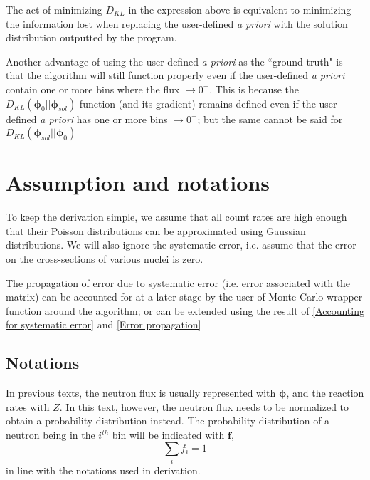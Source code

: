 \documentclass[a4paper, 12pt]{article}
\newcommand{\matr}[1]{\uuline{\bf{#1}}}
\newcommand{\ve}[1]{\boldsymbol{#1}}
\newcommand{\apriori}[0]{\textit{a priori} }
\begin{document}
    The act of minimizing $D_{KL}$ in the expression above is equivalent to minimizing the information lost when replacing the user-defined \apriori with the solution distribution outputted by the program.


    Another advantage of using the user-defined \apriori as the ``ground truth" is that the algorithm will still function properly even if the user-defined \apriori contain one or more bins where the flux $\to 0^+$. This is because the $D_{KL}(\ve{\phi}_0||\ve{\phi}_{sol})$ function (and its gradient) remains defined even if the user-defined \apriori has one or more bins $\to 0^+$; but the same cannot be said for $D_{KL}(\ve{\phi}_{sol}||\ve{\phi}_0)$
\section{Assumption and notations}
    To keep the derivation simple, we assume that all count rates are high enough that their Poisson distributions can be approximated using Gaussian distributions. We will also ignore the systematic error, i.e. assume that the error on the cross-sections of various nuclei is zero.

    The propagation of error due to systematic error (i.e. error associated with the \matr{R} matrix) can be accounted for at a later stage by the user of Monte Carlo wrapper function around the algorithm; or can be extended using the result of \ref{Accounting for systematic error} and \ref{Error propagation}
\subsection{Notations}\label{Notations}
    In previous texts, the neutron flux is usually represented with $\ve{\phi}$, and the reaction rates with $Z$. In this text, however, the neutron flux needs to be normalized to obtain a probability distribution instead. The probability distribution of a neutron being in the $i^{th}$ bin will be indicated with $\ve{f}$,
    \begin{equation}
        \sum_i f_i =1
    \end{equation}
    in line with the notations used in \cite{MAXED1998Reginatto} derivation. 
\end{document}
